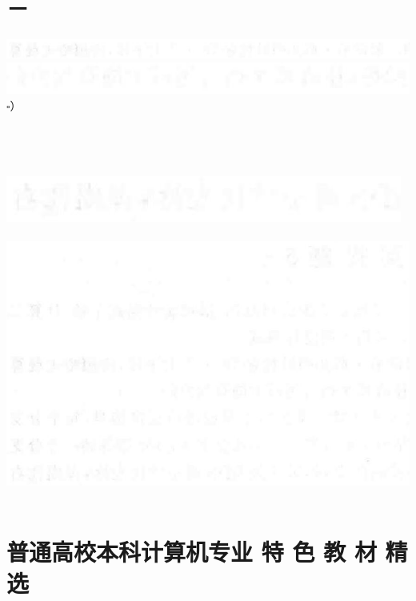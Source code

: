\documentclass[10pt]{article}
\begin{document}
\section*{－}
\includegraphics[max width=\textwidth, center]{2025_06_06_704745ea57b15b2333e5g-183(2)}\\
\includegraphics[max width=\textwidth, center]{2025_06_06_704745ea57b15b2333e5g-183(3)}\\
$\square$）\\
$\qquad$\\
$\qquad$\\
$\qquad$\\
$\qquad$\\
\includegraphics[max width=\textwidth, center]{2025_06_06_704745ea57b15b2333e5g-183(1)}\\
$\qquad$\\
\includegraphics[max width=\textwidth, center]{2025_06_06_704745ea57b15b2333e5g-183(4)}\\
$\qquad$

\section*{普通高校本科计算机专业 特 色 教 材 精 选}
\end{document}
